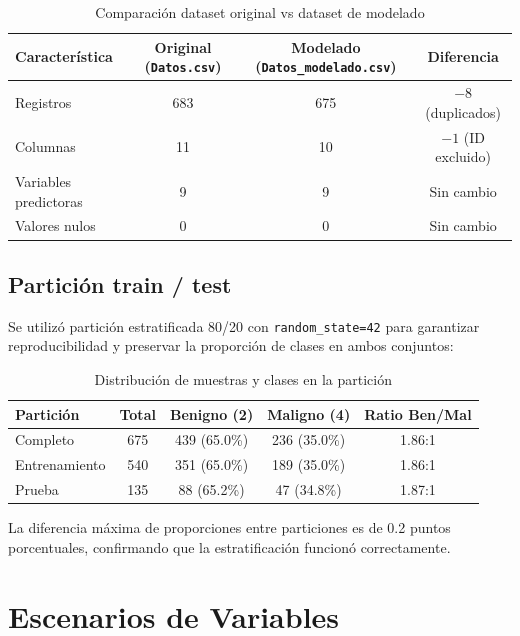 \documentclass[11pt,a4paper]{article}
\begin{document}
\begin{table}[H]
\centering
\caption{Comparación dataset original vs dataset de modelado}
\begin{tabular}{lccc}
\toprule
\textbf{Característica} & \textbf{Original (\texttt{Datos.csv})} & \textbf{Modelado (\texttt{Datos\_modelado.csv})} & \textbf{Diferencia} \\
\midrule
Registros & 683 & 675 & $-8$ (duplicados) \\
Columnas & 11 & 10 & $-1$ (ID excluido) \\
Variables predictoras & 9 & 9 & Sin cambio \\
Valores nulos & 0 & 0 & Sin cambio \\
\bottomrule
\end{tabular}
\end{table}

\subsection{Partición train / test}

Se utilizó partición estratificada 80/20 con \texttt{random\_state=42} para garantizar reproducibilidad y preservar la proporción de clases en ambos conjuntos:

\begin{table}[H]
\centering
\caption{Distribución de muestras y clases en la partición}
\begin{tabular}{lcccc}
\toprule
\textbf{Partición} & \textbf{Total} & \textbf{Benigno (2)} & \textbf{Maligno (4)} & \textbf{Ratio Ben/Mal} \\
\midrule
\rowcolor{lightgray}
Completo & 675 & 439 (65.0\%) & 236 (35.0\%) & 1.86:1 \\
Entrenamiento & 540 & 351 (65.0\%) & 189 (35.0\%) & 1.86:1 \\
Prueba & 135 & 88 (65.2\%) & 47 (34.8\%) & 1.87:1 \\
\bottomrule
\end{tabular}
\end{table}

La diferencia máxima de proporciones entre particiones es de 0.2 puntos porcentuales, confirmando que la estratificación funcionó correctamente.

\section{Escenarios de Variables}
\end{document}
